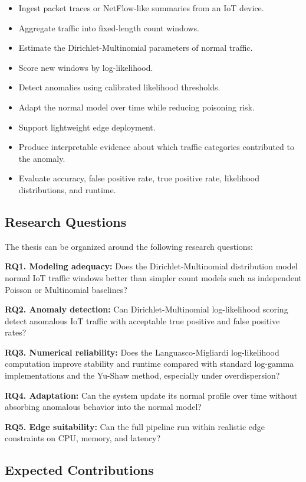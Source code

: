 \documentclass[11pt,a4paper]{article}
\begin{document}
\begin{itemize}
  \item Ingest packet traces or NetFlow-like summaries from an IoT device.
  \item Aggregate traffic into fixed-length count windows.
  \item Estimate the Dirichlet-Multinomial parameters of normal traffic.
  \item Score new windows by log-likelihood.
  \item Detect anomalies using calibrated likelihood thresholds.
  \item Adapt the normal model over time while reducing poisoning risk.
  \item Support lightweight edge deployment.
  \item Produce interpretable evidence about which traffic categories contributed to the anomaly.
  \item Evaluate accuracy, false positive rate, true positive rate, likelihood distributions, and runtime.
\end{itemize}

\subsection{Research Questions}

The thesis can be organized around the following research questions:

\textbf{RQ1. Modeling adequacy:} Does the Dirichlet-Multinomial distribution model normal IoT traffic windows better than simpler count models such as independent Poisson or Multinomial baselines?

\textbf{RQ2. Anomaly detection:} Can Dirichlet-Multinomial log-likelihood scoring detect anomalous IoT traffic with acceptable true positive and false positive rates?

\textbf{RQ3. Numerical reliability:} Does the Languasco-Migliardi log-likelihood computation improve stability and runtime compared with standard log-gamma implementations and the Yu-Shaw method, especially under overdispersion?

\textbf{RQ4. Adaptation:} Can the system update its normal profile over time without absorbing anomalous behavior into the normal model?

\textbf{RQ5. Edge suitability:} Can the full pipeline run within realistic edge constraints on CPU, memory, and latency?

\subsection{Expected Contributions}
\end{document}
